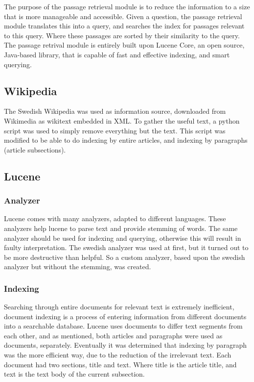 The purpose of the passage retrieval module is to reduce the information to a size that is more manageable 
and accessible.
Given a question, the passage retrieval module translates this into a query, and searches the index for passages 
relevant to this query. Where these passages are sorted by their similarity to the query.
The passage retrival module is entirely built upon Lucene Core, an open source, Java-based library, 
that is capable of fast and effective indexing, and smart querying. \cite{lucenecore}

\subsection{Wikipedia}
The Swedish Wikipedia was used as information source, downloaded from Wikimedia \cite{wikimedia} as wikitext embedded in XML.
To gather the useful text, a python script\cite{wikiextractor} was used to simply remove everything but the text. 
This script was modified to be able to do indexing by entire articles, and indexing by paragraphs (article subsections).

\subsection{Lucene}

\subsubsection{Analyzer}
Lucene comes with many analyzers, adapted to different languages. 
These analyzers help lucene to parse text and provide stemming of words.
The same analyzer should be used for indexing and querying, otherwise this will result in faulty interpretation.
The swedish analyzer was used at first, but it turned out to be more destructive than helpful. 
So a custom analyzer, based upon the swedish analyzer but without the stemming, was created.

\subsubsection{Indexing}
Searching through entire documents for relevant text is extremely inefficient, 
document indexing is a process of entering information from different documents into a searchable database. 
Lucene uses documents to differ text segments from each other, and as mentioned, both articles and paragraphs were used as documents, separately.
Eventually it was determined that indexing by paragraph was the more efficient way, due to the reduction of the irrelevant text.
Each document had two sections, title and text. Where title is the article title, and text is the text body of the current subsection.

